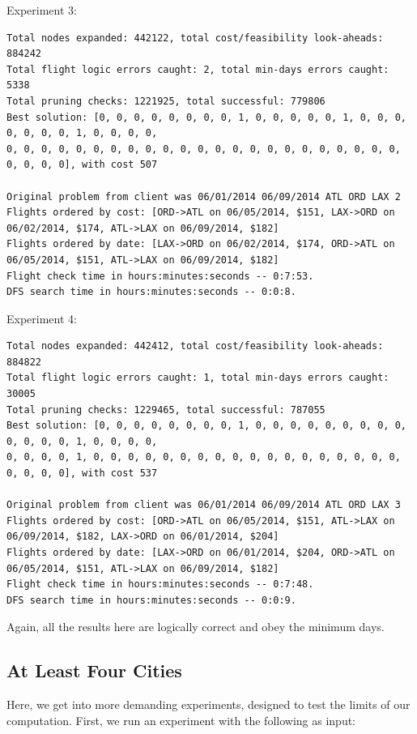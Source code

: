 \documentclass{article}
\begin{document}
Experiment 3:

\scriptsize
\begin{verbatim}
Total nodes expanded: 442122, total cost/feasibility look-aheads: 884242
Total flight logic errors caught: 2, total min-days errors caught: 5338
Total pruning checks: 1221925, total successful: 779806
Best solution: [0, 0, 0, 0, 0, 0, 0, 0, 1, 0, 0, 0, 0, 0, 1, 0, 0, 0, 0, 0, 0, 0, 1, 0, 0, 0, 0,
0, 0, 0, 0, 0, 0, 0, 0, 0, 0, 0, 0, 0, 0, 0, 0, 0, 0, 0, 0, 0, 0, 0, 0, 0, 0, 0], with cost 507

Original problem from client was 06/01/2014 06/09/2014 ATL ORD LAX 2
Flights ordered by cost: [ORD->ATL on 06/05/2014, $151, LAX->ORD on 06/02/2014, $174, ATL->LAX on 06/09/2014, $182]
Flights ordered by date: [LAX->ORD on 06/02/2014, $174, ORD->ATL on 06/05/2014, $151, ATL->LAX on 06/09/2014, $182]
Flight check time in hours:minutes:seconds -- 0:7:53.
DFS search time in hours:minutes:seconds -- 0:0:8.
\end{verbatim}
\normalsize

Experiment 4:

\scriptsize
\begin{verbatim}
Total nodes expanded: 442412, total cost/feasibility look-aheads: 884822
Total flight logic errors caught: 1, total min-days errors caught: 30005
Total pruning checks: 1229465, total successful: 787055
Best solution: [0, 0, 0, 0, 0, 0, 0, 0, 1, 0, 0, 0, 0, 0, 0, 0, 0, 0, 0, 0, 0, 0, 1, 0, 0, 0, 0,
0, 0, 0, 0, 1, 0, 0, 0, 0, 0, 0, 0, 0, 0, 0, 0, 0, 0, 0, 0, 0, 0, 0, 0, 0, 0, 0], with cost 537

Original problem from client was 06/01/2014 06/09/2014 ATL ORD LAX 3
Flights ordered by cost: [ORD->ATL on 06/05/2014, $151, ATL->LAX on 06/09/2014, $182, LAX->ORD on 06/01/2014, $204]
Flights ordered by date: [LAX->ORD on 06/01/2014, $204, ORD->ATL on 06/05/2014, $151, ATL->LAX on 06/09/2014, $182]
Flight check time in hours:minutes:seconds -- 0:7:48.
DFS search time in hours:minutes:seconds -- 0:0:9.
\end{verbatim}
\normalsize

Again, all the results here are logically correct and obey the minimum days.


\subsection{At Least Four Cities}\label{app:many-cities}

Here, we get into more demanding experiments, designed to test the limits of our computation. First, we run an experiment with the following as input:
\end{document}
